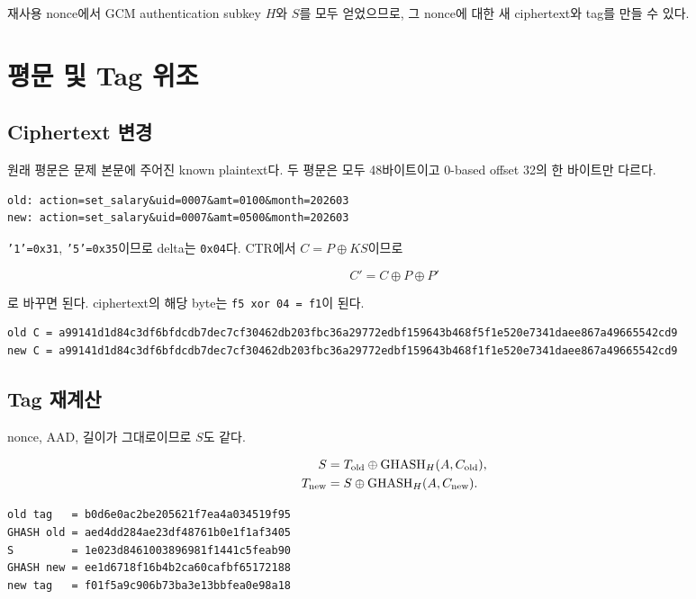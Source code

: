 \documentclass[10pt,a4paper]{article}
\begin{document}
재사용 nonce에서 GCM authentication subkey $H$와 $S$를 모두 얻었으므로,
그 nonce에 대한 새 ciphertext와 tag를 만들 수 있다.

\section{평문 및 Tag 위조}

\subsection{Ciphertext 변경}

원래 평문은 문제 본문에 주어진 known plaintext다. 두 평문은 모두
48바이트이고 0-based offset 32의 한 바이트만 다르다.

\begin{lstlisting}
old: action=set_salary&uid=0007&amt=0100&month=202603
new: action=set_salary&uid=0007&amt=0500&month=202603
\end{lstlisting}

\texttt{'1'=0x31}, \texttt{'5'=0x35}이므로 delta는 \texttt{0x04}다.
CTR에서 $C=P\oplus KS$이므로

\[
C'=C\oplus P\oplus P'
\]

로 바꾸면 된다. ciphertext의 해당 byte는
\texttt{f5 xor 04 = f1}이 된다.

\begin{lstlisting}
old C = a99141d1d84c3df6bfdcdb7dec7cf30462db203fbc36a29772edbf159643b468f5f1e520e7341daee867a49665542cd9
new C = a99141d1d84c3df6bfdcdb7dec7cf30462db203fbc36a29772edbf159643b468f1f1e520e7341daee867a49665542cd9
\end{lstlisting}

\subsection{Tag 재계산}

nonce, AAD, 길이가 그대로이므로 $S$도 같다.

\[
\begin{aligned}
S&=T_{\rm old}\oplus\operatorname{GHASH}_H(A,C_{\rm old}),\\
T_{\rm new}&=S\oplus\operatorname{GHASH}_H(A,C_{\rm new}).
\end{aligned}
\]

\begin{lstlisting}
old tag   = b0d6e0ac2be205621f7ea4a034519f95
GHASH old = aed4dd284ae23df48761b0e1f1af3405
S         = 1e023d8461003896981f1441c5feab90
GHASH new = ee1d6718f16b4b2ca60cafbf65172188
new tag   = f01f5a9c906b73ba3e13bbfea0e98a18
\end{lstlisting}
\end{document}
